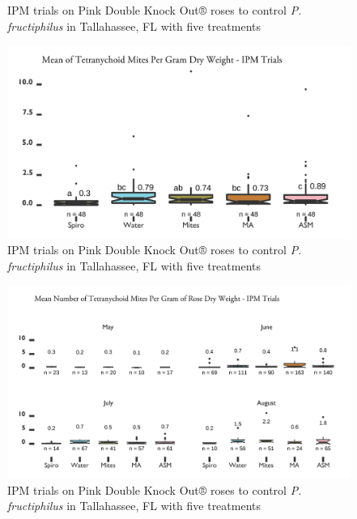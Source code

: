 \documentclass{ufdissertation}[overrideChapters] %
\begin{document}
{\begin{figure}
{}

\caption{IPM trials on Pink Double Knock Out® roses to control \textit{P. fructiphilus} in Tallahassee, FL with five treatments}\label{fig:ipm-talla-erios-month}
\end{figure}
\begin{figure}

{\centering \includegraphics[width=1\linewidth]{figure/rrv_ipm_graph_tets_talla} 

}

\caption{IPM trials on Pink Double Knock Out® roses to control \textit{P. fructiphilus} in Tallahassee, FL with five treatments}\label{fig:ipm-talla-tets}
\end{figure}
\begin{figure}

{\centering \includegraphics[width=1\linewidth]{figure/rrv_ipm_graph_tets_talla_month} 

}

\caption{IPM trials on Pink Double Knock Out® roses to control \textit{P. fructiphilus} in Tallahassee, FL with five treatments}\label{fig:ipm-talla-tets-month}
\end{figure}
\begin{figure}


\end{figure}}
\end{document}
